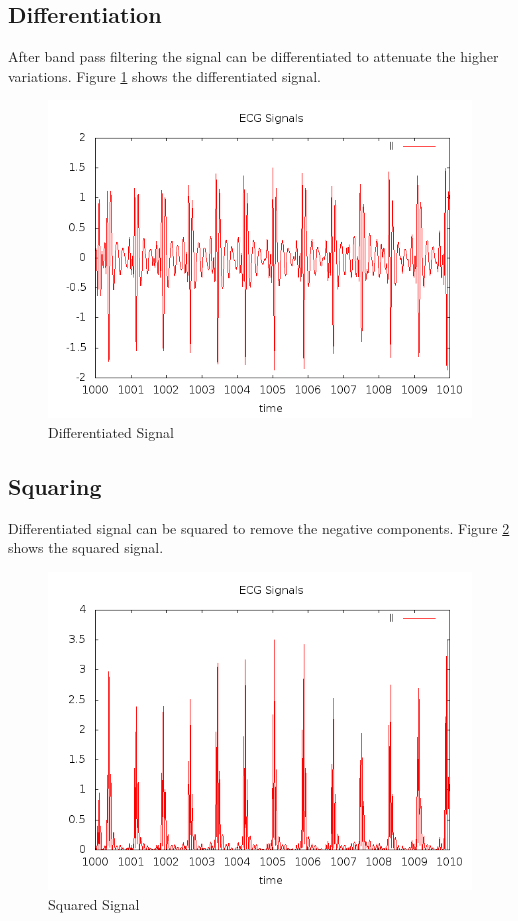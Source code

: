 \subsection{Differentiation}
After band pass filtering the signal can be differentiated to attenuate the higher variations. Figure \ref{differentiated_signal} shows the differentiated signal.
\begin{figure}
        \centering
        \includegraphics[width=\textwidth]{ecg_differentiated.png}
        \caption{Differentiated Signal}
        \label{differentiated_signal}
\end{figure}
\subsection{Squaring} 
Differentiated signal can be squared to remove the negative components. Figure \ref{squared_signal} shows the squared signal.
\begin{figure}
        \centering
        \includegraphics[width=\textwidth]{ecg_squared.png}
        \caption{Squared Signal}
        \label{squared_signal}
\end{figure}
